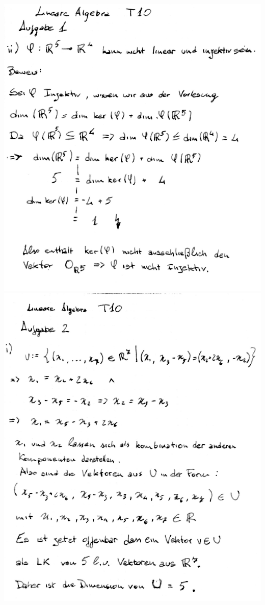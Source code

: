 \documentclass[10pt,a4paper]{article}
\begin{document}
\includegraphics[scale=0.25]{lat1_2.jpg} \\
\includegraphics[scale=0.25]{lat1_3.jpg}  \\
\end{document}
